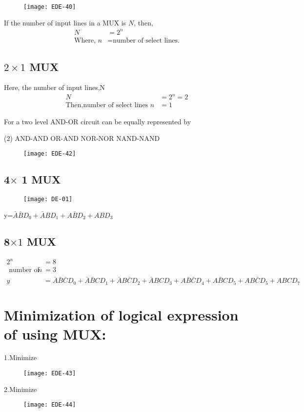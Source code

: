 \begin{figure}[H]
	\centering
	\texttt{[image: EDE-40]}
	\caption{}
	\label{}
\end{figure}
If the number of input lines in a MUX is $N$, then,
\begin{align*}
N&=2^n\\
\text{Where, } n&=\text{number of select lines.}
\end{align*}
\subsection{$2 \times 1$ MUX}
Here, the number of input lines,N
\begin{align*}
N&=2^{n}=2\\
\text{Then,number of select lines } n&=1
\end{align*}
\begin{example}
 For a two level AND-OR circuit can be equally represented by
	\begin{tasks}(2)
		\task[\textbf{a.}]AND-AND
		\task[\textbf{b.}]OR-AND
		\task[\textbf{c.}]NOR-NOR
		\task[\textbf{d.}] NAND-NAND
	\end{tasks}

		\begin{figure}[H]
			\centering
			\texttt{[image: EDE-42]}
		\end{figure}
	
\end{example}
\subsection{4$\times$ 1 MUX}
\begin{figure}[H]
	\texttt{[image: DE-01]}
\end{figure}
\quad y=$\bar{A}\bar{B}D_0+\bar{A}BD_1+A\bar{B}D_2+ABD_3$
\subsection{8$\times 1$ MUX}
\begin{align*}
	2^n&=8\\
 \text{ number of select lines, }n&=3\\
	y&=\bar{A}\bar{B} \bar{C}D_0+\bar{A}\bar{B} CD_1+
	\bar{A}B\bar{C}D_2+\bar{A}BCD_3+
	A \bar{B}\bar{C}D_4+A\bar{B}CD_5+
	AB\bar{C}D_5+ABCD_7
\end{align*}
\section
{Minimization of logical expression of using MUX:}
1.\quad  Minimize
\begin{figure}[H]
	\centering
	\texttt{[image: EDE-43]}
\end{figure}
2.\quad  Minimize
\begin{figure}[H]
	\centering
	\texttt{[image: EDE-44]}
\end{figure}
